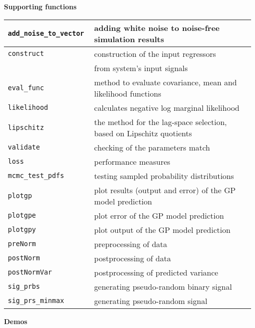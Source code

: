 \documentclass[12pt,twoside]{article}
\newcommand{\fun}[1]{\tt #1}
\begin{document}
{{\bf  Supporting functions}\\
\begin{tabular}{|l|l|}
 \hline \fun{add\_noise\_to\_vector} & adding white noise to noise-free simulation results\\
 \hline \fun{construct} & construction of the input regressors\\
  & from system's input signals\\
 \hline \fun{eval\_func} & method to evaluate covariance, mean and likelihood functions\\
 \hline \fun{likelihood} & calculates negative log marginal likelihood\\
 \hline \fun{lipschitz} & the method for the lag-space selection, based on Lipschitz quotients\\
 \hline \fun{validate} & checking of the parameters match \\
 \hline \fun{loss} & performance measures \\
 \hline \fun{mcmc\_test\_pdfs} & testing sampled probability distributions\\
 \hline \fun{plotgp} & plot results (output and error) of the GP model prediction \\
 \hline \fun{plotgpe} & plot error of the GP model prediction \\
 \hline \fun{plotgpy} & plot output of the GP model prediction \\
 \hline \fun{preNorm} & preprocessing of data \\
 \hline \fun{postNorm} & postprocessing of data \\
 \hline \fun{postNormVar} & postprocessing of predicted variance\\
 \hline \fun{sig\_prbs} & generating pseudo-random binary signal \\
 \hline \fun{sig\_prs\_minmax} & generating pseudo-random signal \\ \hline
\end{tabular}



\pagebreak
{\bf Demos} \\
\begin{tabular}{|l|l|}


\end{tabular}}
\end{document}
